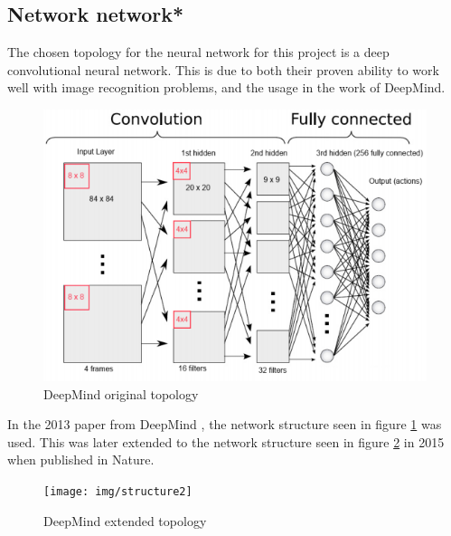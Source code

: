 \documentclass[10pt]{article}
\begin{document}
	\subsection{Network network*}
		The chosen topology for the neural network for this project is a deep convolutional neural network. This is due to both their proven ability to work well with image recognition problems, and the usage in the work of DeepMind.\\
		
		\begin{figure}[h]				
			\includegraphics[scale=0.7]{img/structure}
			\centering
			\caption{DeepMind original topology \cite{repli}}
			\label{fig:topology13}
		\end{figure}
		
		In the 2013 paper from DeepMind \cite{ataridrl}, the network structure seen in figure \ref{fig:topology13} was used. This was later extended to the network structure seen in figure \ref{fig:topology15} in 2015 when published in Nature.\\
		
		\begin{figure}[h]				
			\texttt{[image: img/structure2]}
			\centering
			\caption{DeepMind extended topology}
			\label{fig:topology15}
		\end{figure}
		
\end{document}
